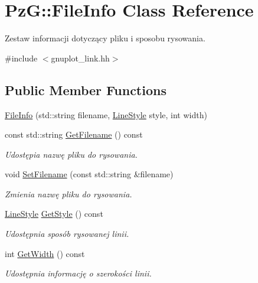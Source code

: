 \hypertarget{class_pz_g_1_1_file_info}{}\section{PzG\+:\+:File\+Info Class Reference}
\label{class_pz_g_1_1_file_info}


Zestaw informacji dotyczący pliku i sposobu rysowania.  




{\ttfamily \#include $<$gnuplot\+\_\+link.\+hh$>$}

\subsection*{Public Member Functions}
\begin{DoxyCompactItemize}
\item 
\hyperlink{class_pz_g_1_1_file_info_a09603738e0fbc8d6dadda905a5e947d7}{File\+Info} (std\+::string filename, \hyperlink{namespace_pz_g_ab0580cdb6bfe9e51d7de2588bc824076}{Line\+Style} style, int width)
\item 
const std\+::string \hyperlink{class_pz_g_1_1_file_info_a22aff3716073c3755d308851ce253188}{Get\+Filename} () const 
\begin{DoxyCompactList}\small\item\em Udostępia nazwę pliku do rysowania. \end{DoxyCompactList}\item 
void \hyperlink{class_pz_g_1_1_file_info_a02c728f892c6f169b738adac8ed9d5f1}{Set\+Filename} (const std\+::string \&filename)
\begin{DoxyCompactList}\small\item\em Zmienia nazwę pliku do rysowania. \end{DoxyCompactList}\item 
\hyperlink{namespace_pz_g_ab0580cdb6bfe9e51d7de2588bc824076}{Line\+Style} \hyperlink{class_pz_g_1_1_file_info_a9548e8dce5707b93edd5cc6d9fd06c0d}{Get\+Style} () const 
\begin{DoxyCompactList}\small\item\em Udostępnia sposób rysowanej linii. \end{DoxyCompactList}\item 
int \hyperlink{class_pz_g_1_1_file_info_a44863ad6997e427a736e8b4663d5a1bc}{Get\+Width} () const 
\begin{DoxyCompactList}\small\item\em Udostępnia informację o szerokości linii. \end{DoxyCompactList}\end{DoxyCompactItemize}
